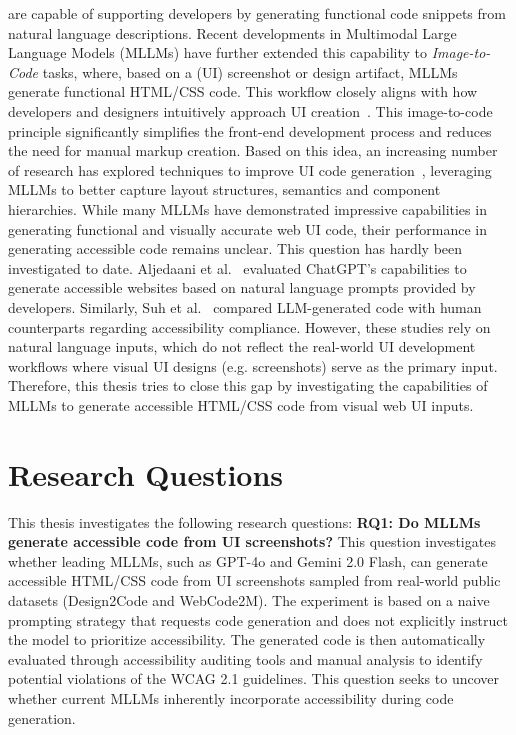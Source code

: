 are capable of supporting developers by generating functional code 
snippets from natural language descriptions. Recent developments in 
Multimodal Large Language Models (MLLMs) have further extended this capability to
\textit{Image-to-Code} tasks, where, based on a (UI) screenshot or design 
artifact,
MLLMs generate functional HTML/CSS code. This workflow closely aligns 
with how developers and designers intuitively approach UI
creation~\cite{chen2018ui,feng2022auto}. This image-to-code 
principle significantly simplifies the front-end development process and 
reduces the need for manual markup creation. Based on this idea,
an increasing number of research has explored techniques to improve 
UI code generation~\cite{cali2025prototype,mowar2025codea11y,wu2025ui2code}, 
leveraging MLLMs to better capture layout structures, semantics 
and component hierarchies. 
\newline While many MLLMs have demonstrated impressive capabilities 
in generating functional and visually accurate web UI code, 
their performance in generating accessible code remains unclear.
This question has hardly been investigated to date. 
Aljedaani et al.~\cite{aljedaani2024chatgpt} evaluated ChatGPT's
capabilities to generate accessible websites based on natural 
language prompts provided by developers. Similarly, Suh et 
al.~\cite{suh2025accessiblecode} compared LLM-generated code
with human counterparts regarding accessibility compliance.
However, these studies rely on natural language inputs, which do
not reflect the real-world UI development workflows where visual 
UI designs (e.g. screenshots) serve as the primary input. Therefore,
this thesis tries to close this gap by investigating the capabilities 
of MLLMs to generate accessible HTML/CSS code from visual web 
UI inputs. 

\section{Research Questions}
This thesis investigates the following research questions: 
\newline\newline
\textbf{RQ1: Do MLLMs generate accessible code from UI screenshots?}
This question investigates whether leading MLLMs, such as GPT-4o and 
Gemini 2.0 Flash, can generate accessible HTML/CSS code from UI 
screenshots sampled from real-world public datasets (Design2Code and 
WebCode2M). The experiment is based on a naive prompting strategy 
that requests code generation and does not explicitly instruct 
the model to prioritize accessibility. The generated code is 
then automatically evaluated through accessibility auditing tools and 
manual analysis to identify potential violations of the WCAG 2.1
guidelines. This question seeks to uncover whether current MLLMs
inherently incorporate accessibility during 
code generation.\newline

